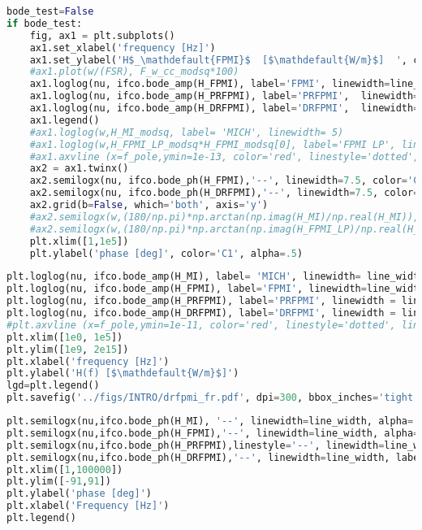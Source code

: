 \begin{lstlisting}[frame=single, language=Python]
bode_test=False
if bode_test:
    fig, ax1 = plt.subplots()
    ax1.set_xlabel('frequency [Hz]')
    ax1.set_ylabel('H$_\mathdefault{FPMI}$  [$\mathdefault{W/m}$]  ', color='C0')
    #ax1.plot(w/(FSR), F_w_cc_modsq*100)
    ax1.loglog(nu, ifco.bode_amp(H_FPMI), label='FPMI', linewidth=line_width, linestyle=':',color='C0')
    ax1.loglog(nu, ifco.bode_amp(H_PRFPMI), label='PRFPMI',  linewidth=line_width, color='C0')
    ax1.loglog(nu, ifco.bode_amp(H_DRFPMI), label='DRFPMI',  linewidth=line_width, color='C1')
    ax1.legend()
    #ax1.loglog(w,H_MI_modsq, label= 'MICH', linewidth= 5)
    #ax1.loglog(w,H_FPMI_LP_modsq*H_FPMI_modsq[0], label='FPMI LP', linewidth = 20.0, alpha=0.25,color='C2')
    #ax1.axvline (x=f_pole,ymin=1e-13, color='red', linestyle='dotted', linewidth=3)
    ax2 = ax1.twinx()
    ax2.semilogx(nu, ifco.bode_ph(H_FPMI),'--', linewidth=7.5, color='C0', alpha=.3)
    ax2.semilogx(nu, ifco.bode_ph(H_DRFPMI),'--', linewidth=7.5, color='C1', alpha=.3)
    ax2.grid(b=False, which='both', axis='y')
    #ax2.semilogx(w,(180/np.pi)*np.arctan(np.imag(H_MI)/np.real(H_MI)), '--')
    #ax2.semilogx(w,(180/np.pi)*np.arctan(np.imag(H_FPMI_LP)/np.real(H_FPMI_LP)),linestyle='--', linewidth=20.0,dashes=(4,10),alpha=.25, color='C2')
    plt.xlim([1,1e5])
    plt.ylabel('phase [deg]', color='C1', alpha=.5)
\end{lstlisting}

\begin{lstlisting}[frame=single, language=Python]
plt.loglog(nu, ifco.bode_amp(H_MI), label= 'MICH', linewidth= line_width, alpha=.4)
plt.loglog(nu, ifco.bode_amp(H_FPMI), label='FPMI', linewidth=line_width, alpha=.4)
plt.loglog(nu, ifco.bode_amp(H_PRFPMI), label='PRFPMI', linewidth = line_width, alpha=.4)
plt.loglog(nu, ifco.bode_amp(H_DRFPMI), label='DRFPMI', linewidth = line_width)
#plt.axvline (x=f_pole,ymin=1e-11, color='red', linestyle='dotted', linewidth=3)
plt.xlim([1e0, 1e5])
plt.ylim([1e9, 2e15])
plt.xlabel('frequency [Hz]')
plt.ylabel('H(f) [$\mathdefault{W/m}$]')
lgd=plt.legend()
plt.savefig('../figs/INTRO/drfpmi_fr.pdf', dpi=300, bbox_inches='tight')
\end{lstlisting}

\begin{lstlisting}[frame=single, language=Python]
plt.semilogx(nu,ifco.bode_ph(H_MI), '--', linewidth=line_width, alpha=.4, label='MICH')
plt.semilogx(nu,ifco.bode_ph(H_FPMI),'--', linewidth=line_width, alpha=.4, label='FPMI')
plt.semilogx(nu,ifco.bode_ph(H_PRFPMI),linestyle='--', linewidth=line_width,dashes=(3,10), alpha=.4, label='PRFPMI')
plt.semilogx(nu,ifco.bode_ph(H_DRFPMI),'--', linewidth=line_width, label='DRFPMI')
plt.xlim([1,100000])
plt.ylim([-91,91])
plt.ylabel('phase [deg]')
plt.xlabel('Frequency [Hz]')
plt.legend()
\end{lstlisting}

